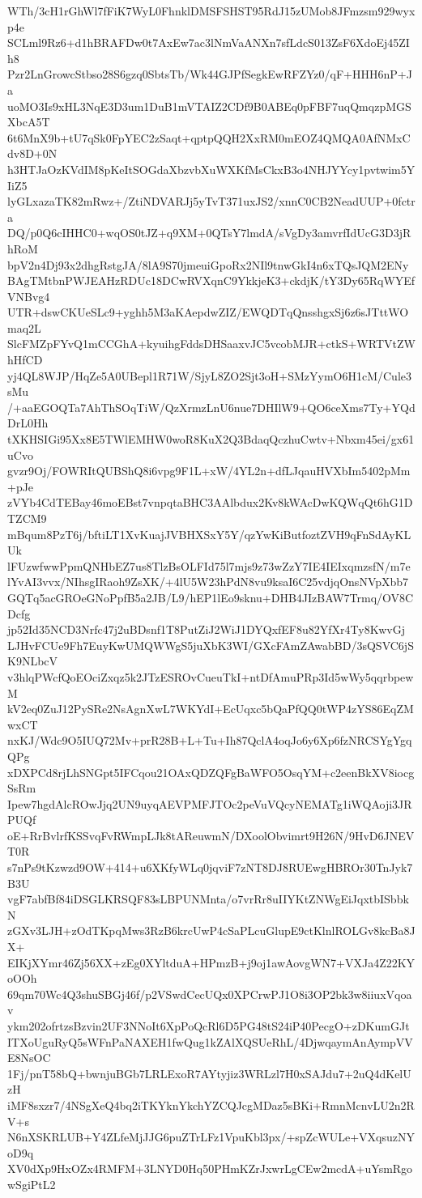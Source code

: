 WTh/3cH1rGhWl7fFiK7WyL0FhnklDMSFSHST95RdJ15zUMob8JFmzsm929wyxp4e
SCLml9Rz6+d1hBRAFDw0t7AxEw7ac3lNmVaANXn7sfLdcS013ZsF6XdoEj45ZIh8
Pzr2LnGrowcStbso28S6gzq0SbtsTb/Wk44GJPfSegkEwRFZYz0/qF+HHH6nP+Ja
uoMO3Is9xHL3NqE3D3um1DuB1mVTAIZ2CDf9B0ABEq0pFBF7uqQmqzpMGSXbcA5T
6t6MnX9b+tU7qSk0FpYEC2zSaqt+qptpQQH2XxRM0mEOZ4QMQA0AfNMxCdv8D+0N
h3HTJaOzKVdIM8pKeItSOGdaXbzvbXuWXKfMsCkxB3o4NHJYYcy1pvtwim5YIiZ5
lyGLxazaTK82mRwz+/ZtiNDVARJj5yTvT371uxJS2/xnnC0CB2NeadUUP+0fctra
DQ/p0Q6cIHHC0+wqOS0tJZ+q9XM+0QTsY7lmdA/sVgDy3amvrfIdUcG3D3jRhRoM
bpV2n4Dj93x2dhgRstgJA/8lA9S70jmeuiGpoRx2NIl9tnwGkI4n6xTQsJQM2ENy
BAgTMtbnPWJEAHzRDUc18DCwRVXqnC9YkkjeK3+ckdjK/tY3Dy65RqWYEfVNBvg4
UTR+dswCKUeSLc9+yghh5M3aKAepdwZIZ/EWQDTqQnsshgxSj6z6sJTttWOmaq2L
SlcFMZpFYvQ1mCCGhA+kyuihgFddsDHSaaxvJC5vcobMJR+ctkS+WRTVtZWhHfCD
yj4QL8WJP/HqZe5A0UBepl1R71W/SjyL8ZO2Sjt3oH+SMzYymO6H1cM/Cule3sMu
/+aaEGOQTa7AhThSOqTiW/QzXrmzLnU6nue7DHIlW9+QO6ceXms7Ty+YQdDrL0Hh
tXKHSIGi95Xx8E5TWlEMHW0woR8KuX2Q3BdaqQczhuCwtv+Nbxm45ei/gx61uCvo
gvzr9Oj/FOWRItQUBShQ8i6vpg9F1L+xW/4YL2n+dfLJqauHVXbIm5402pMm+pJe
zVYb4CdTEBay46moEBst7vnpqtaBHC3AAlbdux2Kv8kWAcDwKQWqQt6hG1DTZCM9
mBqum8PzT6j/bftiLT1XvKuajJVBHXSxY5Y/qzYwKiButfoztZVH9qFnSdAyKLUk
lFUzwfwwPpmQNHbEZ7us8TlzBsOLFId75l7mjs9z73wZzY7IE4IEIxqmzsfN/m7e
lYvAI3vvx/NIhsgIRaoh9ZsXK/+4lU5W23hPdN8vu9ksaI6C25vdjqOnsNVpXbb7
GQTq5acGROeGNoPpfB5a2JB/L9/hEP1lEo9sknu+DHB4JIzBAW7Trmq/OV8CDcfg
jp52Id35NCD3Nrfc47j2uBDsnf1T8PutZiJ2WiJ1DYQxfEF8u82YfXr4Ty8KwvGj
LJHvFCUe9Fh7EuyKwUMQWWgS5juXbK3WI/GXcFAmZAwabBD/3sQSVC6jSK9NLbcV
v3hlqPWcfQoEOciZxqz5k2JTzESROvCueuTkI+ntDfAmuPRp3Id5wWy5qqrbpewM
kV2eq0ZuJ12PySRe2NsAgnXwL7WKYdI+EcUqxc5bQaPfQQ0tWP4zYS86EqZMwxCT
nxKJ/Wdc9O5IUQ72Mv+prR28B+L+Tu+Ih87QclA4oqJo6y6Xp6fzNRCSYgYgqQPg
xDXPCd8rjLhSNGpt5IFCqou21OAxQDZQFgBaWFO5OsqYM+c2eenBkXV8iocgSsRm
Ipew7hgdAlcROwJjq2UN9uyqAEVPMFJTOc2peVuVQcyNEMATg1iWQAoji3JRPUQf
oE+RrBvlrfKSSvqFvRWmpLJk8tAReuwmN/DXoolObvimrt9H26N/9HvD6JNEVT0R
s7nPs9tKzwzd9OW+414+u6XKfyWLq0jqviF7zNT8DJ8RUEwgHBROr30TnJyk7B3U
vgF7abfBf84iDSGLKRSQF83sLBPUNMnta/o7vrRr8uIIYKtZNWgEiJqxtbISbbkN
zGXv3LJH+zOdTKpqMws3RzB6krcUwP4cSaPLcuGlupE9ctKlnlROLGv8kcBa8JX+
EIKjXYmr46Zj56XX+zEg0XYltduA+HPmzB+j9oj1awAovgWN7+VXJa4Z22KYoOOh
69qm70Wc4Q3shuSBGj46f/p2VSwdCecUQx0XPCrwPJ1O8i3OP2bk3w8iiuxVqoav
ykm202ofrtzsBzvin2UF3NNoIt6XpPoQcRl6D5PG48tS24iP40PecgO+zDKumGJt
ITXoUguRyQ5sWFnPaNAXEH1fwQug1kZAlXQSUeRhL/4DjwqaymAnAympVVE8NsOC
1Fj/pnT58bQ+bwnjuBGb7LRLExoR7AYtyjiz3WRLzl7H0xSAJdu7+2uQ4dKelUzH
iMF8sxzr7/4NSgXeQ4bq2iTKYknYkchYZCQJcgMDaz5sBKi+RmnMcnvLU2n2RV+s
N6nXSKRLUB+Y4ZLfeMjJJG6puZTrLFz1VpuKbl3px/+spZcWULe+VXqsuzNYoD9q
XV0dXp9HxOZx4RMFM+3LNYD0Hq50PHmKZrJxwrLgCEw2mcdA+uYsmRgowSgiPtL2
